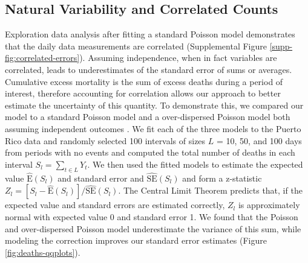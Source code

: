 \documentclass[11pt]{article}
\begin{document}
\subsection{Natural Variability and Correlated Counts}
\label{subsec:natural-variability}
Exploration data analysis after fitting a standard Poisson model demonstrates that the daily data measurements are correlated (Supplemental Figure \ref{supp-fig:correlated-errors}). Assuming independence, when in fact variables are correlated, leads to underestimates of the standard error of sums or averages. Cumulative excess mortality is the sum of excess deaths during a period of interest, therefore accounting for correlation allows our approach to better estimate the uncertainty of this quantity. To demonstrate this, we compared our model to a standard Poisson model and a over-dispersed Poisson model both assuming independent outcomes \cite{farrington1996statistical,hohle2008count,noufaily2013improved,salmon2016monitoring}. We fit each of the three models to the Puerto Rico data and randomly selected 100 intervals of sizes $L$ = 10, 50, and 100 days from periods with no events and computed the total number of deaths in each interval $S_l = \sum_{t \in L} Y_t$. We then used the fitted models to estimate the expected value $\hat{\mbox{E}}(S_l)$ and standard error  and $\hat{\mbox{SE}}(S_l)$ and form a z-statistic $Z_l = [S_l - \hat{\mbox{E}}(S_l)]/\hat{\mbox{SE}}(S_l)$. The Central Limit Theorem predicts that, if the expected value and standard errors are estimated correctly, $Z_l$ is approximately normal with expected value 0 and standard error 1. We found that the Poisson and over-dispersed Poisson model underestimate the variance of this sum, while modeling the correction improves our standard error estimates (Figure \ref{fig:deaths-qqplots}). 
\end{document}
